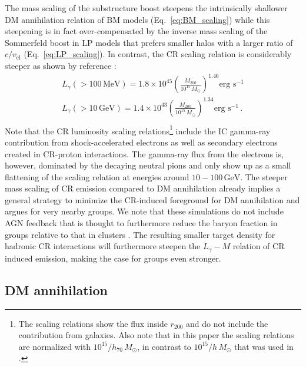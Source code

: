 \documentclass[10pt,aps,pra,reprint,amsmath,amsfonts,amssymb,showpacs,nofootinbib,floatfix]{revtex4-1}
\newcommand{\rmn}{\mathrm}
\newcommand{\msun}{M_\odot}
\newcommand{\mev}{\rmn{MeV}}
\newcommand{\gev}{\rmn{GeV}}
\newcommand{\sigv}{v_\rmn{cl}}
\newcommand{\rvir}{r_{200}}
\newcommand{\mvir}{M_{200}}
\begin{document}
The mass scaling of the substructure boost steepens the intrinsically
shallower DM annihilation relation of BM models
(Eq.~\ref{eq:BM_scaling}) while this steepening is in fact
over-compensated by the inverse mass scaling of the Sommerfeld boost
in LP models that prefers smaller halos with a larger ratio of
$c/\sigv$ (Eq.~\ref{eq:LP_scaling}). In contrast, the CR scaling
relation is considerably steeper as shown by reference
\cite{2010MNRAS.409..449P}:
\begin{eqnarray}
L_{\gamma}(>100\,\mev) = 1.8\times10^{45}
\left(\frac{\mvir}{10^{15}\,\msun}\right)^{1.46}\mbox{erg~s}^{-1}\nonumber\\
L_{\gamma}(>10\,\gev)  = 1.4\times10^{43}
\left(\frac{\mvir}{10^{15}\,\msun}\right)^{1.34}\mbox{erg~s}^{-1}\,.\nonumber\\
\end{eqnarray}
Note that the CR luminosity scaling relations\footnote{The scaling
  relations show the flux inside $\rvir$ and do not include the
  contribution from galaxies. Also note that in this paper the scaling
  relations are normalized with $10^{15}/h_{70}\,\msun$, in contrast
  to $10^{15}/h\,\msun$ that was used in \cite{2010MNRAS.409..449P}.}
include the IC gamma-ray contribution from shock-accelerated electrons
as well as secondary electrons created in CR-proton interactions. The
gamma-ray flux from the electrons is, however, dominated by the
decaying neutral pions and only show up as a small flattening of the
scaling relation at energies around $10-100\,\gev$. The steeper mass
scaling of CR emission compared to DM annihilation already implies a
general strategy to minimize the CR-induced foreground for DM
annihilation and argues for very nearby groups. We note that these
simulations do not include AGN feedback that is thought to furthermore
reduce the baryon fraction in groups relative to that in clusters
\cite{2008ApJ...687L..53P}. The resulting smaller target density for
hadronic CR interactions will furthermore steepen the $L_\gamma-M$
relation of CR induced emission, making the case for groups even
stronger.

\subsection{DM annihilation}
\end{document}
